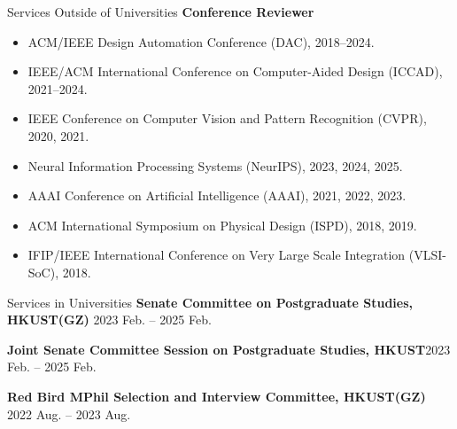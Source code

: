 \begin{rSection}{Services Outside of Universities}
\textbf{Conference Reviewer}
\begin{itemize}
    \item ACM/IEEE Design Automation Conference (DAC), 2018--2024.
    \item IEEE/ACM International Conference on Computer-Aided Design (ICCAD), 2021--2024.
    \item IEEE Conference on Computer Vision and Pattern Recognition (CVPR), 2020, 2021.
    \item Neural Information Processing Systems (NeurIPS), 2023, 2024, 2025.
    \item AAAI Conference on Artificial Intelligence (AAAI), 2021, 2022, 2023.
    \item ACM International Symposium on Physical Design (ISPD), 2018, 2019.
    \item IFIP/IEEE International Conference on Very Large Scale Integration (VLSI-SoC), 2018.
\end{itemize}
\end{rSection}

\begin{rSection}{Services in Universities}
{\bf Senate Committee on Postgraduate Studies, HKUST(GZ)}\hfill { 2023 Feb. -- 2025 Feb.}

{\bf Joint Senate Committee Session on Postgraduate Studies, HKUST}\hfill {2023 Feb. -- 2025 Feb.}

{\bf Red Bird MPhil Selection and Interview Committee, HKUST(GZ)}\hfill { 2022 Aug. -- 2023 Aug.}
\end{rSection}
